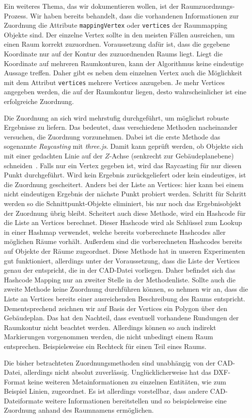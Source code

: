 Ein weiteres Thema, das wir dokumentieren wollen, ist der Raumzuordnungs-Prozess.
Wir haben bereits behandelt, dass die vorhandenen Informationen zur Zuordnung die Attribute \texttt{mappingVertex} oder \texttt{vertices} der Raummapping Objekte sind.
Der einzelne Vertex sollte in den meisten Fällen ausreichen, um einen Raum korrekt zuzuordnen.
Voraussetzung dafür ist, dass die gegebene Koordinate nur auf der Kontur des zuzuordnenden Raums liegt.
Liegt die Koordinate auf mehreren Raumkonturen, kann der Algorithmus keine eindeutige Aussage treffen.
Daher gibt es neben dem einzelnen Vertex auch die Möglichkeit mit dem Attribut \texttt{vertices} mehrere Vertices anzugeben.
Je mehr Vertices angegeben werden, die auf der Raumkontur liegen, desto wahrscheinlicher ist eine erfolgreiche Zuordnung.

Die Zuordnung an sich wird mehrstufig durchgeführt, um möglichst robuste Ergebnisse zu liefern.
Das bedeutet, dass verschiedene Methoden nacheinander versuchen, die Zuordnung vorzunehmen.
Dabei ist die erste Methode das sogenannte \textit{Raycasting} mit \textit{three.js}.
Damit kann geprüft werden, ob Objekte sich mit einer gedachten Linie auf der \(Z\)-Achse (senkrecht zur Gebäudeplanebene) schneiden~\cite{Raycaster}.
Falls nur ein Vertex gegeben ist, wird das Raycasting für nur diesen Punkt durchgeführt.
Wird kein Ergebnis zurückgeliefert oder kein eindeutiges, ist die Zuordnung gescheitert.
Anders bei der Liste an Vertices: hier kann bei einem nicht eindeutigen Ergebnis der nächste Punkt probiert werden.
Schritt für Schritt werden so die Schnittpunkt-Objekte eliminiert, bis nur noch das Ergebnisobjekt der Zuordnung übrig bleibt.
Scheitert auch diese Methode, wird ein Hashcode für die Liste an Vertices berechnet.
Dieser Hashcode wird als Schlüssel zum Lookup in einer Hashmap verwendet, welche bereits vorberechnete Hashcodes aller möglichen Räume vorhält.
Außerdem sind die vorberechneten Hashcodes bereits auf Objekte der Räume zugeordnet.
Diese Methode hat in unseren Experimenten gut funktioniert, allerdings unter der Voraussetzung, dass die Liste der Vertices genau der entspricht, die in der CAD-Datei vorliegen.
Daher befindet sich das Hashcode Mapping nur an zweiter Stelle in der Methodenliste.
Sollte auch die zweite Methode keine Zuordnung durchführen können, so nehmen wir an, dass die Liste an Vertices bereits einer ausreichenden Beschreibung des Raums entspricht.
Dementsprechend zeichnen wir auf Basis der Vertices ein Polygon über den Gebäudeplan.
Das hat den Nachteil, dass eventuell vorhandene Rundungen der Raumkontur nicht beachtet werden.
Allerdings können so auch indirekt Markierungen vorgenommen werden, die nicht unbedingt einem Raum entsprechen.
Beispielsweise ein Rechteck für einen Teil eines Raums.

Die bisher betrachteten Zuordnungsmethoden sind unabhängig von der CAD-Datei, allerdings nicht absolut zuverlässig.
Unglücklicherweise hat das DXF-Format keine weiteren Metainformationen zu einzelnen \glqq{}Entitäten\grqq{}, wie zum Beispiel Linien, zugeordnet.
Es ist allerdings vorstellbar, dass andere CAD-Dateiformate weitere Informationen bereitstellen und so beispielsweise eine Zuordnung anhand des Raumnamens ermöglichen.
